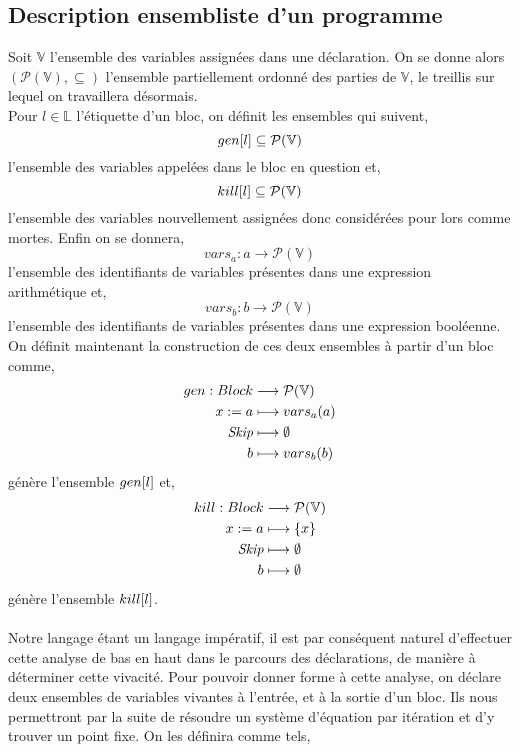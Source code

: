 \documentclass[a4paper, 12pt]{article}
\begin{document}
\subsection{Description ensembliste d'un programme}
Soit $\mathbb{V}$ l'ensemble des variables assignées dans une déclaration. On se donne alors $(\mathcal{P}(\mathbb{V}), \subseteq)$
l'ensemble partiellement ordonné des parties de $\mathbb{V}$, le treillis sur lequel on travaillera désormais.
\\
Pour $l \in \mathbb{L}$ l'étiquette d'un bloc, on définit les ensembles qui suivent,
\[gen[l] \subseteq \mathcal{P}(\mathbb{V})\]
l'ensemble des variables appelées dans le bloc en question et,
\[kill[l] \subseteq \mathcal{P}(\mathbb{V})\]
l'ensemble des variables nouvellement assignées donc considérées pour lors comme mortes. Enfin on se donnera,
\[vars_a : a \longrightarrow \mathcal{P}(\mathbb{V})\]
l'ensemble des identifiants de variables présentes dans une expression arithmétique et,
\[vars_b : b \longrightarrow \mathcal{P}(\mathbb{V})\]
l'ensemble des identifiants de variables présentes dans une expression booléenne.
\\
On définit maintenant la construction de ces deux ensembles à partir d'un bloc comme,
\begin{align*}
	gen : Block &\longrightarrow \mathcal{P}(\mathbb{V})\\
	{x}\space:=\space{a} &\longmapsto vars_a(a)\\
	\textit{Skip} &\longmapsto \emptyset\\
	b &\longmapsto vars_b(b)
\end{align*}
génère l'ensemble $gen[l]$ et,
\begin{align*}
	kill : Block &\longrightarrow \mathcal{P}(\mathbb{V})\\
	{x}\space:=\space{a} &\longmapsto \{x\}\\
	\textit{Skip} &\longmapsto \emptyset\\
	b &\longmapsto \emptyset
\end{align*}
génère l'ensemble $kill[l]$.
\\
\\
Notre langage étant un langage impératif, il est par conséquent naturel d'effectuer cette analyse de bas en haut dans le parcours des déclarations,
de manière à déterminer cette vivacité. Pour pouvoir donner forme à cette analyse, on déclare deux ensembles de variables vivantes à l'entrée, et à la
sortie d'un bloc. Ils nous permettront par la suite de résoudre un système d'équation par itération et d'y trouver un point fixe. 
On les définira comme tels,
\end{document}
